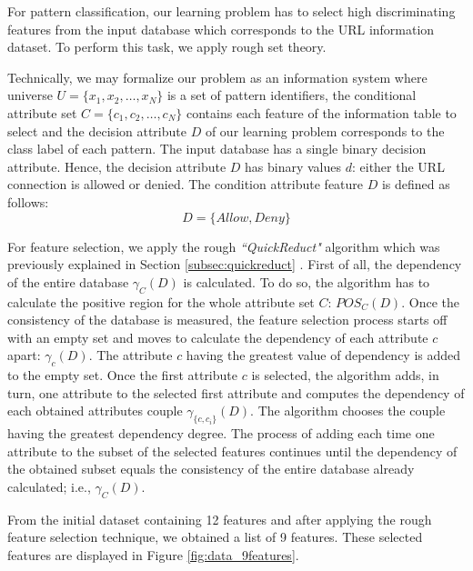 \documentclass{llncs}
\begin{document}
For pattern classification, our learning problem has to select high discriminating features from the input database which corresponds to the URL information dataset. To perform this task, we apply rough set theory. 

Technically, we may formalize our problem as an information system where universe $U = \{x_1, x_2, \ldots, x_N\}$ is a set of pattern identifiers, the conditional attribute set $C =\{c_1,c_2, \ldots, c_N\}$ contains each feature of the information table to select and the decision attribute $D$ of our learning problem corresponds to the class label of each pattern. The input database has a single binary decision attribute. Hence, the decision attribute $D$  has binary values $d$:  either the URL connection is allowed   or denied. The condition attribute feature $D$ is defined as follows:
\begin{displaymath}
D =\{Allow, Deny\}
\end{displaymath}

For feature selection, we apply the rough \emph{``QuickReduct"} algorithm which was previously explained in Section \ref{subsec:quickreduct} . First of all, the dependency of the entire database $\gamma_{C}(D)$ is calculated. To do so, the algorithm has to calculate the positive region for the whole attribute set $C$: $POS_{C}(D)$. Once the consistency of the database is measured, the feature selection process starts off with an empty set and moves to calculate the dependency of each attribute $c$ apart: $\gamma_{c}(D)$. The attribute $c$ having the greatest value of dependency is added to the empty set. Once the first attribute $c$ is selected, the algorithm adds, in turn, one attribute to the selected first attribute and computes the dependency of each obtained attributes couple $\gamma_{\{c, c_{i}\}}(D)$. The algorithm chooses the couple having the greatest dependency degree. The process of adding each time one attribute to the subset of the selected features continues until the dependency of the obtained subset equals the consistency of the entire database already calculated; i.e., $\gamma_{C}(D)$.

From the initial dataset containing 12 features and after applying the rough feature selection technique, we obtained a list of 9 features. These selected features are displayed in Figure \ref{fig:data_9features}.
\end{document}
